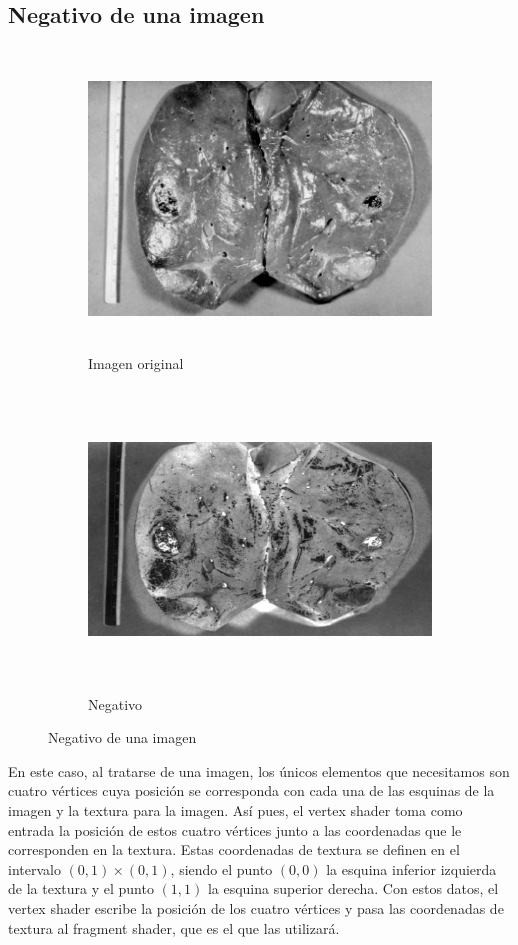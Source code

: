 \subsection{Negativo de una imagen}
\label{makereference5.5.6}

\begin{figure}[h]
	\centering	
	\begin{subfigure}{0.45\textwidth}
		\includegraphics[height=8cm,width=\textwidth]{figures/mynegative0.jpg}
		\caption{Imagen original}
	\end{subfigure}
	\hfill
	\begin{subfigure}{0.45\textwidth}
		\includegraphics[height=8cm,width=\textwidth]{figures/mynegative1.png}
		\caption{Negativo}
	\end{subfigure}
	\caption{Negativo de una imagen}
	\label{fig:mynegative}
\end{figure}

En este caso, al tratarse de una imagen, los únicos elementos que necesitamos
son cuatro vértices cuya posición se corresponda con cada una de las esquinas de
la imagen y la textura para la imagen. Así pues, el vertex shader toma como
entrada la posición de estos cuatro vértices junto a las coordenadas que le
corresponden en la textura. Estas coordenadas de textura se definen en el
intervalo $(0,1)\times(0,1)$, siendo el punto $(0,0)$ la esquina inferior
izquierda de la textura y el punto $(1,1)$ la esquina superior derecha. Con
estos datos, el vertex shader escribe la posición de los cuatro vértices y pasa
las coordenadas de textura al fragment shader, que es el que las utilizará. \\

